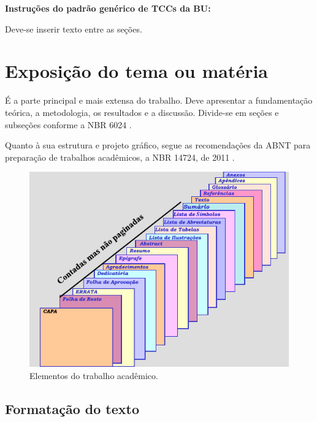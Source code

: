 \textbf{Instruções do padrão genérico de TCCs da BU:}

Deve-se inserir texto entre as seções.

\section{Exposição do tema ou matéria}

É a parte principal e mais extensa do trabalho. Deve apresentar a fundamentação teórica, a metodologia, os resultados e a discussão. Divide-se em seções e subseções conforme a NBR 6024 \cite{NBR6024:2012}.

Quanto à sua estrutura e projeto gráfico, segue as recomendações da \gls{ABNT} para preparação de trabalhos acadêmicos, a NBR 14724, de 2011 \cite{NBR14724:2011}.

\begin{figure}[htb]
	\caption{\label{fig:Fig_1}Elementos do trabalho acadêmico.}
	\begin{center}
		\includegraphics{images/imagem.pdf}
	\end{center}
\end{figure}

\subsection{Formatação do texto}

